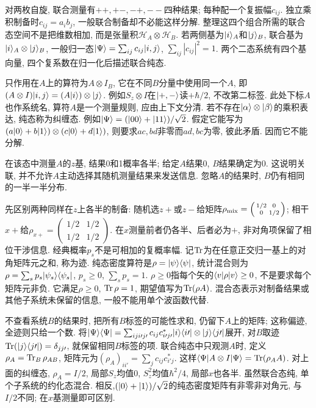 对两枚自旋, 联合测量有$++,+-,-+,--$四种结果; 每种配一个复振幅$c_{ij}$. 独立乘积制备时$c_{ij}=a_i b_j$, 一般联合制备却不必能这样分解. 整理这四个组合所需的联合态空间不是把维数相加, 而是张量积$\mathcal H_A\otimes\mathcal H_B$. 若两侧基为$\lvert i\rangle_A$和$\lvert j\rangle_B$, 联合基为$\lvert i\rangle_A\otimes\lvert j\rangle_B$, 一般归一态$\lvert \Psi\rangle=\sum_{ij}c_{ij}\lvert i,j\rangle$, $\sum_{ij}|c_{ij}|^2=1$. 两个二态系统有四个基向量, 四个复系数在归一化后描述联合纯态.

只作用在$A$上的算符为$A\otimes I_B$, 它在不同$B$分量中使用同一个$A$, 即$(A\otimes I)\lvert i,j\rangle=(A\lvert i\rangle)\otimes\lvert j\rangle$. 例如$S_z\otimes I$在$\lvert +,-\rangle$读$+\hbar/2$, 不改第二标签. 此处下标$A$也作系统名, 算符$A$是一个测量规则, 应由上下文分清. 若不存在$\lvert \alpha\rangle\otimes\lvert \beta\rangle$的乘积表达, 纯态称为纠缠态. 例如$\lvert \Psi\rangle=(\lvert 00\rangle+\lvert 11\rangle)/\sqrt2$. 假定它能写为$(a\lvert 0\rangle+b\lvert 1\rangle)\otimes(c\lvert 0\rangle+d\lvert 1\rangle)$, 则要求$ac,bd$非零而$ad,bc$为零, 彼此矛盾. 因而它不能分解.

在该态中测量$A$的$z$基, 结果0和1概率各半; 给定$A$结果0, $B$结果确定为0. 这说明关联, 并不允许$A$主动选择其随机测量结果来发送信息. 忽略$A$的结果时, $B$仍有相同的一半一半分布.

先区别两种同样在$z$上各半的制备: 随机选$z+$或$z-$给矩阵$\rho_{\rm mix}=\left(\begin{smallmatrix}1/2&0\\0&1/2\end{smallmatrix}\right)$; 相干$x+$给$\rho_{x+}=\left(\begin{smallmatrix}1/2&1/2\\1/2&1/2\end{smallmatrix}\right)$. 在$x$测量前者仍各半、后者必为$+$, 非对角项保留了相位干涉信息. 经典概率$p_s$不是可相加的复概率幅. 记$\operatorname{Tr}$为在任意正交归一基上的对角矩阵元之和, 称为迹. 纯态密度算符是$\rho=\lvert \psi\rangle\langle \psi\rvert$, 统计混合则为$\rho=\sum_s p_s\lvert \psi_s\rangle\langle \psi_s\rvert$, $p_s\ge0$, $\sum_sp_s=1$. $\rho\geq0$指每个矢的$\langle v\rvert\rho\lvert v\rangle\geq0$, 不是要求每个矩阵元非负. 它满足$\rho\ge0$, $\operatorname{Tr}\rho=1$, 期望值写为$\operatorname{Tr}(\rho A)$. 混合态表示对制备结果或其他子系统未保留的信息, 一般不能用单个波函数代替.

不查看系统$B$的结果时, 把所有$B$标签的可能性求和, 仍留下$A$上的矩阵; 这称偏迹, 全迹则只给一个数. 将$\lvert \Psi\rangle\langle \Psi\rvert=\sum_{iji\prime j\prime}c_{ij}c_{i\prime j\prime}^*\lvert i\rangle\langle i\prime\rvert\otimes\lvert j\rangle\langle j\prime\rvert$展开, 对$B$取迹$\operatorname{Tr}(\lvert j\rangle\langle j\prime\rvert)=\delta_{jj\prime}$, 就保留相同$B$标签的项. 联合纯态中只观测$A$时, 定义$\rho_A=\operatorname{Tr}_B\rho_{AB}$, 矩阵元为$(\rho_A)_{ii'}=\sum_j c_{ij}c_{i'j}^*$. 这样$\langle \Psi\rvert A\otimes I\lvert \Psi\rangle=\operatorname{Tr}(\rho_AA)$. 对上面的纠缠态, $\rho_A=I/2$, 局部$S_z$均值0, $S_z^2$均值$\hbar^2/4$, 局部$x$也各半. 虽然联合态纯, 单个子系统的约化态混合. 相反,$(\lvert 0\rangle+\lvert 1\rangle)/\sqrt2$的纯态密度矩阵有非零非对角元, 与$I/2$不同; 在$x$基测量即可区别.


